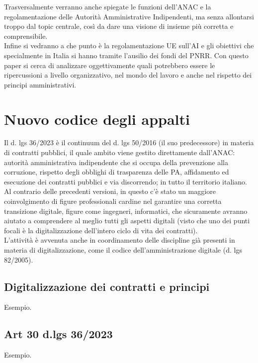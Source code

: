 \documentclass{article}
\begin{document}
\begin{justify}
Trasversalmente verranno anche spiegate le funzioni dell'ANAC e la regolamentazione delle Autorità Amministrative Indipendenti, ma senza allontarsi troppo dal topic centrale, così da dare una visione di insieme più corretta e comprensibile.\\
Infine si vedranno a che punto è la regolamentazione UE sull'AI e gli obiettivi che specialmente in Italia si hanno tramite l'ausilio dei fondi del PNRR.
Con questo paper si cerca di analizzare oggettivamente quali potrebbero essere le ripercussioni a livello organizzativo, nel mondo del lavoro e anche nel rispetto dei principi amministrativi.
\end{justify}

\centering
\section{Nuovo codice degli appalti}
\begin{justify}
    Il d. lgs 36/2023 è il continuum del d. lgs 50/2016 (il suo predecessore) in materia di contratti pubblici, il quale ambito viene gestito direttamente dall'ANAC: autorità amministrativa indipendente che si occupa della prevenzione alla corruzione, rispetto degli obblighi di trasparenza delle PA, affidamento ed esecuzione dei contratti pubblici e via discorrendo; in tutto il territorio italiano.\citep{AnacSite}\\
    Al contrario delle precedenti versioni, in questo c'è stato un maggiore coinvolgimento di figure professionali cardine nel garantire una corretta transizione digitale, figure come ingegneri, informatici, che sicuramente avranno aiutato a comprendere al meglio tutti gli aspetti digitali (visto che uno dei punti focali è la digitalizzazione dell'intero ciclo di vita dei contratti).\\
    L'attività è avvenuta anche in coordinamento delle discipline già presenti in materia di digitalizzazione, come il codice dell'amministrazione digitale (d. lgs 82/2005).
\end{justify}

\newpage\subsection{Digitalizzazione dei contratti e principi}
\begin{justify}
    Esempio.
\end{justify}

\subsection{Art 30 d.lgs 36/2023}
\begin{justify}
    Esempio.
\end{justify}
\end{document}
